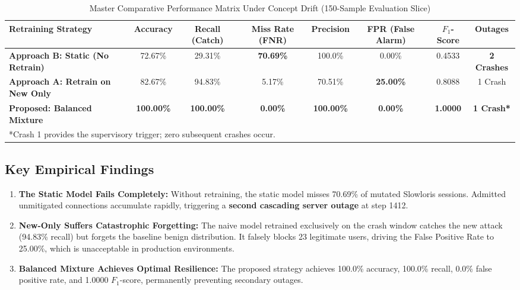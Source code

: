 \documentclass[12pt,a4paper,oneside]{report}
\begin{document}
\begin{table}[H]
\caption{Master Comparative Performance Matrix Under Concept Drift (150-Sample Evaluation Slice)}
\centering
\begin{tabularx}{\textwidth}{l c c c c c c c}
\toprule
\textbf{Retraining Strategy} & \textbf{Accuracy} & \textbf{Recall (Catch)} & \textbf{Miss Rate (FNR)} & \textbf{Precision} & \textbf{FPR (False Alarm)} & \textbf{$F_1$-Score} & \textbf{Outages} \\
\midrule
\textbf{Approach B: Static (No Retrain)} & 72.67\% & 29.31\% & \textbf{70.69\%} & 100.0\% & 0.00\% & 0.4533 & \textbf{2 Crashes} \\
\addlinespace
\textbf{Approach A: Retrain on New Only} & 82.67\% & 94.83\% & 5.17\% & 70.51\% & \textbf{25.00\%} & 0.8088 & 1 Crash \\
\addlinespace
\textbf{Proposed: Balanced Mixture} & \textbf{100.00\%} & \textbf{100.00\%} & \textbf{0.00\%} & \textbf{100.00\%} & \textbf{0.00\%} & \textbf{1.0000} & \textbf{1 Crash*} \\
\bottomrule
\multicolumn{8}{l}{\footnotesize{*Crash 1 provides the supervisory trigger; zero subsequent crashes occur.}}
\end{tabularx}
\label{tab:master_eval}
\end{table}

\subsection{Key Empirical Findings}
\begin{enumerate}
    \item \textbf{The Static Model Fails Completely:} Without retraining, the static model misses 70.69\% of mutated Slowloris sessions. Admitted unmitigated connections accumulate rapidly, triggering a \textbf{second cascading server outage} at step 1412.
    \item \textbf{New-Only Suffers Catastrophic Forgetting:} The naive model retrained exclusively on the crash window catches the new attack (94.83\% recall) but forgets the baseline benign distribution. It falsely blocks 23 legitimate users, driving the False Positive Rate to 25.00\%, which is unacceptable in production environments.
    \item \textbf{Balanced Mixture Achieves Optimal Resilience:} The proposed strategy achieves 100.0\% accuracy, 100.0\% recall, 0.0\% false positive rate, and 1.0000 $F_1$-score, permanently preventing secondary outages.
\end{enumerate}
\end{document}

